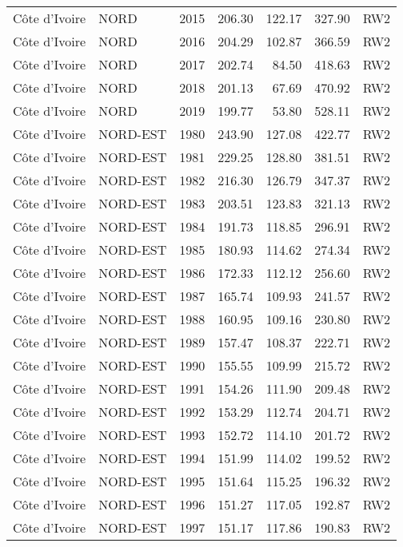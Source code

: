\begin{longtable}{lllrrrl}
  C\^{o}te d'Ivoire & NORD & 2015 & 206.30 & 122.17 & 327.90 & RW2 \\ 
  C\^{o}te d'Ivoire & NORD & 2016 & 204.29 & 102.87 & 366.59 & RW2 \\ 
  C\^{o}te d'Ivoire & NORD & 2017 & 202.74 & 84.50 & 418.63 & RW2 \\ 
  C\^{o}te d'Ivoire & NORD & 2018 & 201.13 & 67.69 & 470.92 & RW2 \\ 
  C\^{o}te d'Ivoire & NORD & 2019 & 199.77 & 53.80 & 528.11 & RW2 \\ 
  C\^{o}te d'Ivoire & NORD-EST & 1980 & 243.90 & 127.08 & 422.77 & RW2 \\ 
  C\^{o}te d'Ivoire & NORD-EST & 1981 & 229.25 & 128.80 & 381.51 & RW2 \\ 
  C\^{o}te d'Ivoire & NORD-EST & 1982 & 216.30 & 126.79 & 347.37 & RW2 \\ 
  C\^{o}te d'Ivoire & NORD-EST & 1983 & 203.51 & 123.83 & 321.13 & RW2 \\ 
  C\^{o}te d'Ivoire & NORD-EST & 1984 & 191.73 & 118.85 & 296.91 & RW2 \\ 
  C\^{o}te d'Ivoire & NORD-EST & 1985 & 180.93 & 114.62 & 274.34 & RW2 \\ 
  C\^{o}te d'Ivoire & NORD-EST & 1986 & 172.33 & 112.12 & 256.60 & RW2 \\ 
  C\^{o}te d'Ivoire & NORD-EST & 1987 & 165.74 & 109.93 & 241.57 & RW2 \\ 
  C\^{o}te d'Ivoire & NORD-EST & 1988 & 160.95 & 109.16 & 230.80 & RW2 \\ 
  C\^{o}te d'Ivoire & NORD-EST & 1989 & 157.47 & 108.37 & 222.71 & RW2 \\ 
  C\^{o}te d'Ivoire & NORD-EST & 1990 & 155.55 & 109.99 & 215.72 & RW2 \\ 
  C\^{o}te d'Ivoire & NORD-EST & 1991 & 154.26 & 111.90 & 209.48 & RW2 \\ 
  C\^{o}te d'Ivoire & NORD-EST & 1992 & 153.29 & 112.74 & 204.71 & RW2 \\ 
  C\^{o}te d'Ivoire & NORD-EST & 1993 & 152.72 & 114.10 & 201.72 & RW2 \\ 
  C\^{o}te d'Ivoire & NORD-EST & 1994 & 151.99 & 114.02 & 199.52 & RW2 \\ 
  C\^{o}te d'Ivoire & NORD-EST & 1995 & 151.64 & 115.25 & 196.32 & RW2 \\ 
  C\^{o}te d'Ivoire & NORD-EST & 1996 & 151.27 & 117.05 & 192.87 & RW2 \\ 
  C\^{o}te d'Ivoire & NORD-EST & 1997 & 151.17 & 117.86 & 190.83 & RW2 \\ 

\end{longtable}
